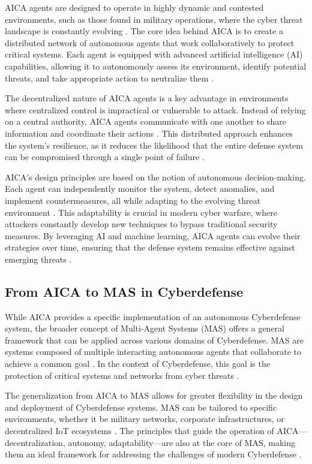AICA agents are designed to operate in highly dynamic and contested environments, such as those found in military operations, where the cyber threat landscape is constantly evolving \cite{kott2018towards}. The core idea behind AICA is to create a distributed network of autonomous agents that work collaboratively to protect critical systems. Each agent is equipped with advanced artificial intelligence (AI) capabilities, allowing it to autonomously assess its environment, identify potential threats, and take appropriate action to neutralize them \cite{kott2023autonomous}.

The decentralized nature of AICA agents is a key advantage in environments where centralized control is impractical or vulnerable to attack. Instead of relying on a central authority, AICA agents communicate with one another to share information and coordinate their actions \cite{kott2018autonomous}. This distributed approach enhances the system's resilience, as it reduces the likelihood that the entire defense system can be compromised through a single point of failure \cite{kott2023autonomous}.

AICA's design principles are based on the notion of autonomous decision-making. Each agent can independently monitor the system, detect anomalies, and implement countermeasures, all while adapting to the evolving threat environment \cite{kott2018towards}. This adaptability is crucial in modern cyber warfare, where attackers constantly develop new techniques to bypass traditional security measures. By leveraging AI and machine learning, AICA agents can evolve their strategies over time, ensuring that the defense system remains effective against emerging threats \cite{chatterjee2023collaboration}.

\subsection{From AICA to MAS in Cyberdefense}

While AICA provides a specific implementation of an autonomous Cyberdefense system, the broader concept of Multi-Agent Systems (MAS) offers a general framework that can be applied across various domains of Cyberdefense. MAS are systems composed of multiple interacting autonomous agents that collaborate to achieve a common goal \cite{kott2018towards}. In the context of Cyberdefense, this goal is the protection of critical systems and networks from cyber threats \cite{jajodia2017autonomous}.

The generalization from AICA to MAS allows for greater flexibility in the design and deployment of Cyberdefense systems. MAS can be tailored to specific environments, whether it be military networks, corporate infrastructures, or decentralized IoT ecosystems \cite{kott2023autonomous}. The principles that guide the operation of AICA—decentralization, autonomy, adaptability—are also at the core of MAS, making them an ideal framework for addressing the challenges of modern Cyberdefense \cite{kolias2011swarm}.

